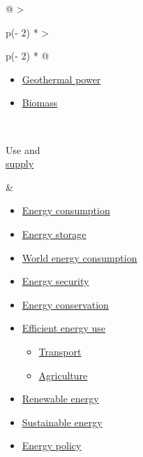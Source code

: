 \documentclass[
]{article}
\providecommand{\tightlist}{%
  \setlength{\itemsep}{0pt}\setlength{\parskip}{0pt}}
\newenvironment{LTR}{\beginL}{\endL}
\begin{document}
\begin{LTR}
\begin{otherlanguage}{english}
\begin{longtable}[]{@{}
  >{\raggedright\arraybackslash}p{(\columnwidth - 2\tabcolsep) * }
  >{\raggedright\arraybackslash}p{(\columnwidth - 2\tabcolsep) * }@{}}
\begin{minipage}[t]{\linewidth}
\begin{itemize}
  \begin{itemize}
  \tightlist
  \item
    \href{/wiki/Hydroelectricity}{Hydroelectricity}
  \item
    \href{/wiki/Wave_farm}{Wave farm}
  \item
    \href{/wiki/Tidal_power}{Tidal power}
  \end{itemize}
\item
  \href{/wiki/Geothermal_power}{Geothermal power}
\item
  \href{/wiki/Biomass}{Biomass}
\end{itemize}
\end{minipage} \\
\begin{minipage}[t]{\linewidth}\raggedright
Use and\\
\href{/wiki/Energy_supply}{supply}\strut
\end{minipage} & \begin{minipage}[t]{\linewidth}\raggedright
\begin{itemize}
\tightlist
\item
  \href{/wiki/Energy_consumption}{Energy consumption}
\item
  \href{/wiki/Energy_storage}{Energy storage}
\item
  \href{/wiki/World_energy_consumption}{World energy consumption}
\item
  \href{/wiki/Energy_security}{Energy security}
\item
  \href{/wiki/Energy_conservation}{Energy conservation}
\item
  \href{/wiki/Efficient_energy_use}{Efficient energy use}

  \begin{itemize}
  \tightlist
  \item
    \href{/wiki/Energy_efficiency_in_transport}{Transport}
  \item
    \href{/wiki/Energy_efficiency_in_agriculture}{Agriculture}
  \end{itemize}
\item
  \href{/wiki/Renewable_energy}{Renewable energy}
\item
  \href{/wiki/Sustainable_energy}{Sustainable energy}
\item
  \href{/wiki/Energy_policy}{Energy policy}


\end{itemize}
\end{minipage}
\end{longtable}
\end{otherlanguage}
\end{LTR}
\end{document}
